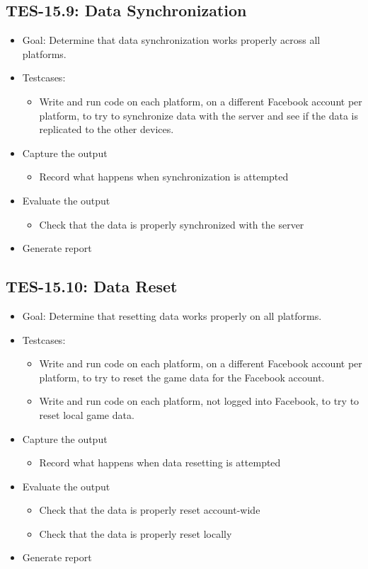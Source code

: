 \subsection{TES-15.9: Data Synchronization}
\label{subsec:sync}
\begin{itemize}
\item Goal: Determine that data synchronization works properly across 
all platforms.
\item Testcases: 
\begin{itemize}
\item Write and run code on each platform, on a different Facebook account 
per platform, to try to synchronize data with the server and see if the 
data is replicated to the other devices.
\end{itemize}
\item Capture the output 
\begin{itemize}
\item Record what happens when synchronization is attempted
\end{itemize}
\item Evaluate the output 
\begin{itemize}
\item Check that the data is properly synchronized with the server
\end{itemize}
\item Generate report 
\end{itemize}

\subsection{TES-15.10: Data Reset}
\label{subsec:reset}
\begin{itemize}
\item Goal: Determine that resetting data works properly on all platforms.
\item Testcases: 
\begin{itemize}
\item Write and run code on each platform, on a different Facebook account 
per platform, to try to reset the game data for the Facebook account.
\item Write and run code on each platform, not logged into Facebook, to 
try to reset local game data.
\end{itemize}
\item Capture the output 
\begin{itemize}
\item Record what happens when data resetting is attempted
\end{itemize}
\item Evaluate the output 
\begin{itemize}
\item Check that the data is properly reset account-wide
\item Check that the data is properly reset locally
\end{itemize}
\item Generate report 
\end{itemize}
